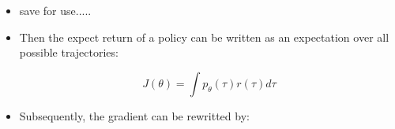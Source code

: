 {\begin{pcolumn}
{\begin{itemize}
	\item \begin{lemma}
	save for use.....
\end{lemma}

	\item Then the expect return of a policy can be written as an expectation over all possible trajectories:

\begin{equation}
	J(\theta) = \int p_\theta(\tau) r(\tau) d\tau
\end{equation}




\end{itemize}
\vspace*{2mm}
}

\end{pcolumn}
%
\hfill
\begin{pcolumn}
{\large
\begin{itemize}

 	\item Subsequently, the gradient can be rewritted by:


\end{itemize}}
\end{pcolumn}}
